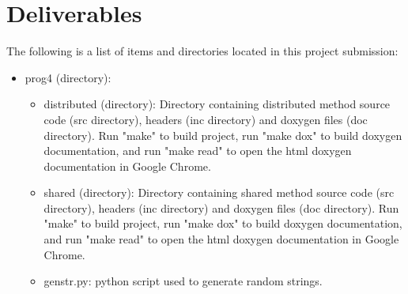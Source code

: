\documentclass{article}
\begin{document}
\section{Deliverables}
  The following is a list of items and directories located in this project submission:
  \begin{itemize}
	\item prog4 (directory):
	  \begin{itemize}
	    \item distributed (directory): Directory containing distributed method source code (src directory), headers (inc directory) and doxygen files (doc directory). Run "make" to build project, run "make dox" to build doxygen documentation, and run "make read" to open the html doxygen documentation in Google Chrome.

	    \item shared (directory): Directory containing shared method source code (src directory), headers (inc directory) and doxygen files (doc directory). Run "make" to build project, run "make dox" to build doxygen documentation, and run "make read" to open the html doxygen documentation in Google Chrome.
	    
	    \item genstr.py: python script used to generate random strings.
	  \end{itemize}
  \end{itemize}          
\end{document}
